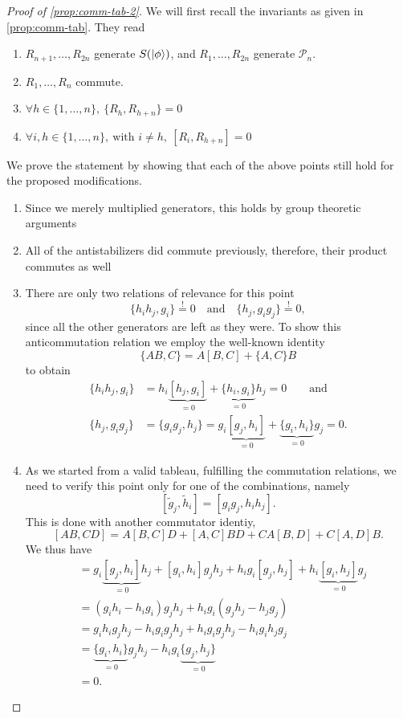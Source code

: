 \begin{proof}[Proof of \cref{prop:comm-tab-2}]
  We will first recall the invariants as given in \cref{prop:comm-tab}.
  They read
  \begin{enumerate}
    \item $R_{n+1},\ldots,R_{2n}$ generate $S(\ket{\phi})$, and $R_1, \ldots,
      R_{2n}$ generate $\mathcal{P}_n$.
    \item $R_1, \ldots, R_n$ commute.
    \item $\forall h \in \{1,\ldots,n\}, \ \{R_h, R_{h+n}\} = 0$
    \item $\forall i,h \in \{1,\ldots,n\}, \ \text{with } i\neq h, \ [R_i, R_{h+n}] = 0$
  \end{enumerate}
  We prove the statement by showing that each of the above points still hold
  for the proposed modifications.
  \begin{enumerate}
    \item Since we merely multiplied generators, this holds by group theoretic
      arguments
    \item All of the antistabilizers did commute previously, therefore, their
      product commutes as well
    \item There are only two relations of relevance for this point
      \[
        \{h_i h_j, g_i\} \overset{\text{!}}{=} 0 \quad{\text{and}} \quad 
        \{h_j, g_i g_j\} \overset{\text{!}}{=} 0, 
      \]
      since all the other generators are left as they were.
      To show this anticommutation relation we employ the well-known identity
      \[ \{AB,C\} = A[B,C] + \{A,C\}B \]
      to obtain
      \begin{align*}
        \{h_i h_j, g_i \} &= h_i \underbrace{[h_j, g_i]}_{=0} +
        \underbrace{\{h_i, g_i\}}_{=0} h_j = 0 \qquad{\text{and}} \\
        \{h_j, g_i g_j \} &= \{g_i g_j, h_j\} = g_i \underbrace{[g_j, h_i]}_{=0} +
        \underbrace{\{g_i, h_i\}}_{=0} g_j = 0
      .\end{align*}
    \item As we started from a valid tableau, fulfilling the commutation
      relations, we need to verify this point only for one of the combinations,
      namely \[ [\tilde{g}_j, \tilde{h}_i] = [ g_i g_j, h_i h_j]. \]
      This is done with another commutator identiy,
      \[
        [AB,CD] = A[B,C]D + [A,C]BD + CA[B,D] + C[A,D]B.
      \]
      We thus have
      \begin{align*}
        [g_i g_j, h_i h_j] &=
          g_i \underbrace{[g_j, h_i]}_{=0} h_j + [g_i, h_i] g_j h_j + h_i g_i
          [g_j, h_j] + h_i \underbrace{[g_i, h_j]}_{=0} g_j \\
           &= (g_i h_i - h_i g_i)g_j h_j + h_i g_i (g_j h_j - h_j g_j) \\
           &= g_i h_i g_j h_j - h_i g_i g_j h_j + h_i g_i g_j h_j - h_i g_i h_j
           g_j \\
           &= \underbrace{\{g_i, h_i\}}_{=0} g_j h_j - h_i g_i
           \underbrace{\{g_j, h_j\}}_{=0} \\
           &= 0
      .\end{align*}
  \end{enumerate}
\end{proof}


